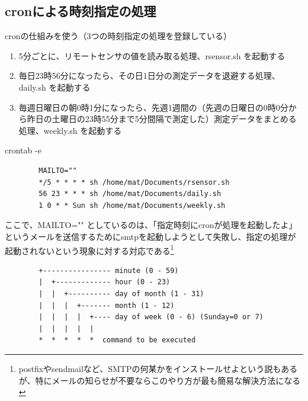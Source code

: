 \documentclass[12pt,a4paper,uplatex]{jsbook}
\begin{document}

\newpage

\subsection{cronによる時刻指定の処理}

cronの仕組みを使う（3つの時刻指定の処理を登録している）
\begin{enumerate}
	\item[(1)] 5分ごとに、リモートセンサの値を読み取る処理、rsensor.sh を起動する
	\item[(2)] 毎日23時56分になったら、その日1日分の測定データを退避する処理、daily.sh を起動する
	\item[(3)] 毎週日曜日の朝0時1分になったら、先週1週間の（先週の日曜日の0時0分から昨日の土曜日の23時55分まで5分間隔で測定した）測定データをまとめる処理、weekly.sh を起動する
\end{enumerate}

\begin{itembox}[l]{crontab -e}
	\begin{verbatim}
		MAILTO=""
		*/5 * * * * sh /home/mat/Documents/rsensor.sh
		56 23 * * * sh /home/mat/Documents/daily.sh
		1 0 * * Sun sh /home/mat/Documents/weekly.sh
	\end{verbatim}
\end{itembox}

ここで、MAILTO="" としているのは、「指定時刻にcronが処理を起動したよ」というメールを送信するためにsmtpを起動しようとして失敗し、指定の処理が起動されないという現象に対する対応である\footnote{postfixやsendmailなど、SMTPの何某かをインストールせよという説もあるが、特にメールの知らせが不要ならこのやり方が最も簡易な解決方法になる}

\begin{screen}
	\begin{verbatim}
		+---------------- minute (0 - 59)
		|  +------------- hour (0 - 23)
		|  |  +---------- day of month (1 - 31)
		|  |  |  +------- month (1 - 12)
		|  |  |  |  +---- day of week (0 - 6) (Sunday=0 or 7)
		|  |  |  |  |
		*  *  *  *  *  command to be executed
	\end{verbatim}
\end{screen}

\end{document}
